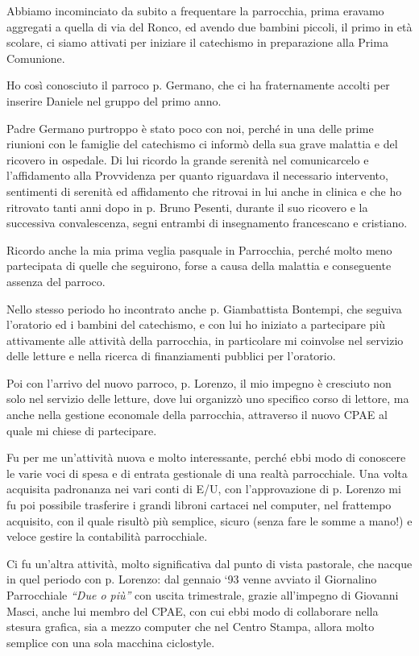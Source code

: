 Abbiamo incominciato da subito a frequentare la parrocchia, prima eravamo aggregati a quella di 
via del Ronco, ed avendo due bambini piccoli, il primo in età scolare, ci siamo attivati per iniziare il 
catechismo in preparazione alla Prima Comunione. 

Ho così conosciuto il parroco p. Germano, che ci ha fraternamente accolti per inserire Daniele nel 
gruppo del primo anno.

Padre Germano purtroppo è stato poco con noi, perché in una delle prime riunioni con le famiglie 
del catechismo ci informò della sua grave malattia e del ricovero in ospedale. Di lui ricordo la 
grande serenità nel comunicarcelo e l’affidamento alla Provvidenza per quanto riguardava il 
necessario intervento, sentimenti di serenità ed affidamento che ritrovai in lui anche in clinica e che 
ho ritrovato tanti anni dopo in p. Bruno Pesenti, durante il suo ricovero e la successiva 
convalescenza, segni entrambi di insegnamento francescano e cristiano.

Ricordo anche la mia prima veglia pasquale in Parrocchia, perché molto meno partecipata di quelle 
che seguirono, forse a causa della malattia e conseguente assenza del parroco.

Nello stesso periodo ho incontrato anche p. Giambattista Bontempi, che seguiva l’oratorio ed i 
bambini del catechismo, e con lui ho iniziato a partecipare più attivamente alle attività della 
parrocchia, in particolare mi coinvolse nel servizio delle letture e nella ricerca di finanziamenti 
pubblici per l’oratorio.

Poi con l’arrivo del nuovo parroco, p. Lorenzo, il mio impegno è cresciuto non solo nel servizio 
delle letture, dove lui organizzò uno specifico corso di lettore, ma anche nella gestione economale 
della parrocchia, attraverso il nuovo CPAE al quale mi chiese di partecipare.

Fu per me un’attività nuova e molto interessante, perché ebbi modo di conoscere le varie voci di 
spesa e di entrata gestionale di una realtà parrocchiale.
Una volta acquisita padronanza nei vari conti di E/U, con l’approvazione di p. Lorenzo mi fu poi 
possibile trasferire i grandi libroni cartacei nel computer, nel frattempo acquisito, con il quale 
risultò più semplice, sicuro (senza fare le somme a mano!) e veloce gestire la contabilità 
parrocchiale.

Ci fu un’altra attività, molto significativa dal punto di vista pastorale, che nacque in quel periodo 
con p. Lorenzo: dal gennaio ‘93 venne avviato il Giornalino Parrocchiale \textit{“Due o più”} con uscita 
trimestrale, grazie all’impegno di Giovanni Masci, anche lui membro del CPAE, con cui ebbi modo 
di collaborare nella stesura grafica, sia a mezzo computer che nel Centro Stampa, allora molto 
semplice con una sola macchina ciclostyle.

